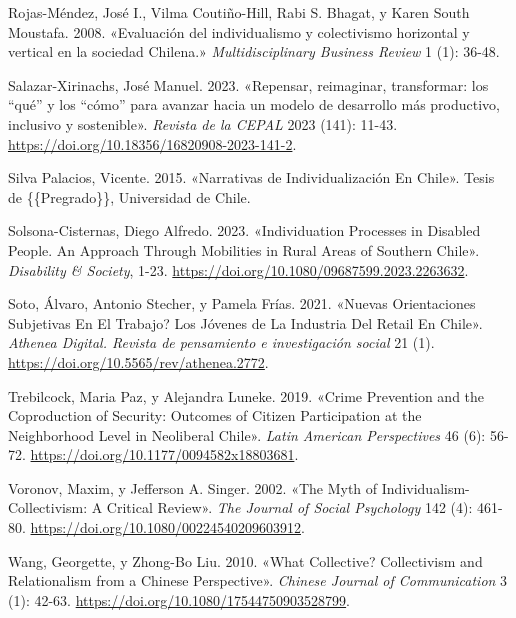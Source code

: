 \documentclass[
  letterpaper,
  DIV=11,
  numbers=noendperiod]{scrartcl}
\newlength{\cslhangindent}
\newenvironment{CSLReferences}[2] %
 {\begin{list}{}{%
  \setlength{\itemindent}{0pt}
  \setlength{\leftmargin}{0pt}
  \setlength{\parsep}{0pt}
  \ifodd #1
   \setlength{\leftmargin}{\cslhangindent}
   \setlength{\itemindent}{-1\cslhangindent}
  \fi
  \setlength{\itemsep}{#2\baselineskip}}}
 {\end{list}}
\begin{document}
\begin{CSLReferences}{1}{0}
Rojas-Méndez, José I., Vilma Coutiño-Hill, Rabi S. Bhagat, y Karen South
Moustafa. 2008. {«{Evaluaci{ó}n del individualismo y colectivismo
horizontal y vertical en la sociedad Chilena.}»} \emph{Multidisciplinary
Business Review} 1 (1): 36-48.

Salazar-Xirinachs, José Manuel. 2023. {«{Repensar, reimaginar,
transformar: los {``qu{é}''} y los {``c{ó}mo''} para avanzar hacia un
modelo de desarrollo m{á}s productivo, inclusivo y sostenible}»}.
\emph{Revista de la CEPAL} 2023 (141): 11-43.
\url{https://doi.org/10.18356/16820908-2023-141-2}.

Silva Palacios, Vicente. 2015. {«Narrativas de {Individualizaci{ó}n} En
{Chile}»}. Tesis de \{\{Pregrado\}\}, Universidad de Chile.

Solsona-Cisternas, Diego Alfredo. 2023. {«Individuation Processes in
Disabled People. {An} Approach Through Mobilities in Rural Areas of
Southern {Chile}»}. \emph{Disability \& Society}, 1-23.
\url{https://doi.org/10.1080/09687599.2023.2263632}.

Soto, Álvaro, Antonio Stecher, y Pamela Frías. 2021.
{«{\textquestiondown}{Nuevas} Orientaciones Subjetivas En El Trabajo?
{Los} J{ó}venes de La Industria Del Retail En {Chile}»}. \emph{Athenea
Digital. Revista de pensamiento e investigaci{ó}n social} 21 (1).
\url{https://doi.org/10.5565/rev/athenea.2772}.

Trebilcock, Maria Paz, y Alejandra Luneke. 2019. {«Crime {Prevention}
and the {Coproduction} of {Security}: {Outcomes} of {Citizen
Participation} at the {Neighborhood Level} in {Neoliberal Chile}»}.
\emph{Latin American Perspectives} 46 (6): 56-72.
\url{https://doi.org/10.1177/0094582x18803681}.

Voronov, Maxim, y Jefferson A. Singer. 2002. {«The {Myth} of
{Individualism-Collectivism}: {A Critical Review}»}. \emph{The Journal
of Social Psychology} 142 (4): 461-80.
\url{https://doi.org/10.1080/00224540209603912}.

Wang, Georgette, y Zhong-Bo Liu. 2010. {«What Collective? {Collectivism}
and Relationalism from a {Chinese} Perspective»}. \emph{Chinese Journal
of Communication} 3 (1): 42-63.
\url{https://doi.org/10.1080/17544750903528799}.


\end{CSLReferences}
\end{document}
